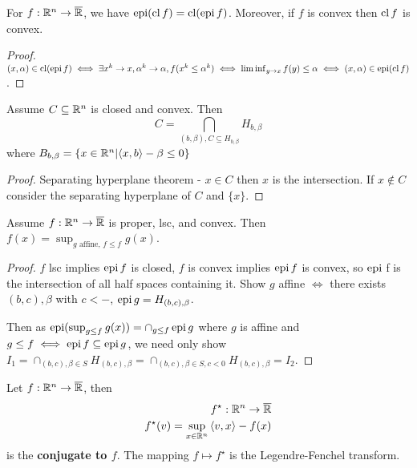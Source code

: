 \begin{thm}
  \label{sec:conjugate-functions-3}
  For $f: \mathbb{R}^{n} \rightarrow \overline {\mathbb{R}}$, we have $\operatorname*{epi} (\operatorname*{cl} f) =
  \operatorname*{cl} (\operatorname*{epi} f)$.  Moreover, if $f$ is convex then $\operatorname*{cl} f$ is convex.
\end{thm}

\begin{proof}
  $(x, \alpha) \in \operatorname*{cl}(\operatorname*{epi} f) \iff \exists x^{k} \rightarrow x,
  \alpha^{k} \rightarrow \alpha, f(x^{k} \leq \alpha^{k}) \iff
  \liminf_{y \rightarrow x} f(y) \leq \alpha \iff (x, \alpha) \in \operatorname*{epi}
  (\operatorname*{cl} f)$.
\end{proof}

\begin{thm}
  \label{sec:conjugate-functions-4}
  Assume $C \subseteq \mathbb{R}^{n}$ is closed and convex.  Then
  \begin{equation}
    C = \bigcap_{(b, \beta), C \subseteq H_{b, \beta}} H_{b, \beta}
  \end{equation}
  where $B_{b, \beta} = \{ x \in \R^{n} | \IP{x, b} - \beta \leq 0 \}$
\end{thm}

\begin{proof}
  Separating hyperplane theorem - $x \in C$ then $x$ is the
  intersection. If $x \notin C$ consider the separating hyperplane of
  $C$ and $\{ x \} $.
\end{proof}

\begin{thm}
  \label{sec:conjugate-functions-5}
  Assume $f: \mathbb{R}^{n} \rightarrow \overline {\mathbb{R}}$ is proper, lsc, and
  convex.  Then $f(x) = \sup_{\text{$g$ affine, $f \leq f$}} g(x)$.
\end{thm}

\begin{proof}
  $f$ lsc implies $\operatorname*{epi} f$ is closed, $f$ is convex implies $\operatorname*{epi} f$ is
  convex, so $\operatorname*{epi} $ f is the intersection of all half spaces
  containing it.  Show $g$ affine $\iff$ there exists $(b, c), \beta$
  with $c < -$, $\operatorname*{epi} g = H_{(b, c), \beta}$.

  Then as $\operatorname*{epi} (\sup_{g \leq f} g(x)) = \cap_{g \leq f} \operatorname*{epi} g$
  where $g$ is affine and $g \leq f \iff \operatorname*{epi} f \subseteq \operatorname*{epi} g$, we
  need only show $I_{1} = \cap_{(b, c), \beta \in S} H_{(b, c), \beta}
  = \cap_{(b, c), \beta \in S, c < 0} H_{(b, c), \beta} = I_{2}$.
\end{proof}

\begin{defn}
  \label{sec:conjugate-functions-6}
  Let $f: \mathbb{R}^{n} \rightarrow \overline {\mathbb{R}}$, then
  \begin{align}
    \label{eq:8}
    f^{\star}: \R^{n} \rightarrow \overline \R \\
    f^{\star}(v) = \sup_{x \in \R^{n}} \IP{v, x} - f(x)
  \end{align} is the \textbf{conjugate to $f$}.  The mapping $f
  \mapsto f^{\star}$ is the Legendre-Fenchel transform.
\end{defn}


